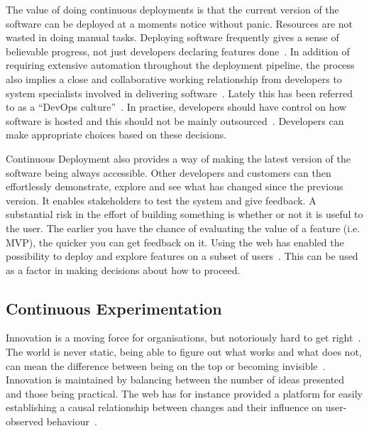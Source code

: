 \documentclass[english]{tktltiki2}
\begin{document}
The value of doing continuous deployments is that the current version of the software can be deployed at a moments notice without panic. Resources are not wasted in doing manual tasks. Deploying software frequently gives a sense of believable progress, not just developers declaring features done~\cite{Fow13a}. In addition of requiring extensive automation throughout the deployment pipeline, the process also implies a close and collaborative working relationship from developers to system specialists involved in delivering software~\cite{HAB12, Fow13a}. Lately this has been referred to as a “DevOps culture”~\cite{Fow13a}. In practise, developers should have control on how software is hosted and this should not be mainly outsourced~\cite{HF11}. Developers can make appropriate choices based on these decisions.

Continuous Deployment also provides a way of making the latest version of the software being always accessible. Other developers and customers can then effortlessly demonstrate, explore and see what has changed since the previous version. It enables stakeholders to test the system and give feedback. A substantial risk in the effort of building something is whether or not it is useful to the user. The earlier you have the chance of evaluating the value of a feature (i.e. MVP), the quicker you can get feedback on it. Using the web has enabled the possibility to deploy and explore features on a subset of users~\cite{Fow06, Fow13a}. This can be used as a factor in making decisions about how to proceed.

\subsection{Continuous Experimentation}

Innovation is a moving force for organisations, but notoriously hard to get right~\cite{BE12}. The world is never static, being able to figure out what works and what does not, can mean the difference between being on the top or becoming invisible~\cite{KLS09}. Innovation is maintained by balancing between the number of ideas presented and those being practical. The web has for instance provided a platform for easily establishing a causal relationship between changes and their influence on user-observed behaviour~\cite{KLS09}.
\end{document}
